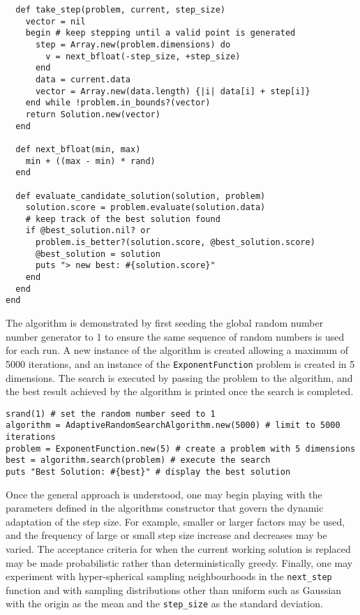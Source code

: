 \begin{lstlisting}
  def take_step(problem, current, step_size)
    vector = nil
    begin # keep stepping until a valid point is generated
      step = Array.new(problem.dimensions) do
        v = next_bfloat(-step_size, +step_size) 
      end
      data = current.data
      vector = Array.new(data.length) {|i| data[i] + step[i]}
    end while !problem.in_bounds?(vector)
    return Solution.new(vector)
  end

  def next_bfloat(min, max)
    min + ((max - min) * rand)
  end
  
  def evaluate_candidate_solution(solution, problem)
    solution.score = problem.evaluate(solution.data)
    # keep track of the best solution found
    if @best_solution.nil? or
      problem.is_better?(solution.score, @best_solution.score)
      @best_solution = solution
      puts "> new best: #{solution.score}"               
    end
  end  
end
\end{lstlisting}

The algorithm is demonstrated by first seeding the global random number number generator to 1 to ensure the same sequence of random numbers is used for each run. A new instance of the algorithm is created allowing a maximum of 5000 iterations, and an instance of the \texttt{ExponentFunction} problem is created in 5 dimensions. The search is executed by passing the problem to the algorithm, and the best result achieved by the algorithm is printed once the search is completed.

\begin{lstlisting}
srand(1) # set the random number seed to 1
algorithm = AdaptiveRandomSearchAlgorithm.new(5000) # limit to 5000 iterations 
problem = ExponentFunction.new(5) # create a problem with 5 dimensions
best = algorithm.search(problem) # execute the search
puts "Best Solution: #{best}" # display the best solution
\end{lstlisting}

Once the general approach is understood, one may begin playing with the parameters defined in the algorithms constructor that govern the dynamic adaptation of the step size. For example, smaller or larger factors may be used, and the frequency of large or small step size increase and decreases may be varied. The acceptance criteria for when the current working solution is replaced may be made probabilistic rather than deterministically greedy. Finally, one may experiment with hyper-spherical sampling neighbourhoods in the \texttt{next\_step} function and with sampling distributions other than uniform such as Gaussian with the origin as the mean and the \texttt{step\_size} as the standard deviation.

